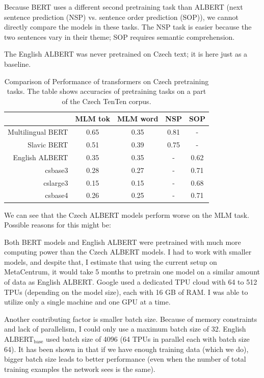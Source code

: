 \documentclass[
  printed, %
  color,   %
  table,   %
  oneside, %
  lof,     %
  lot,     %
]{fithesis3}
\begin{document}
Because BERT uses a different second pretraining task than ALBERT (next sentence prediction (NSP) vs. sentence order prediction (SOP)), we cannot directly compare the models in these tasks. The NSP task is easier because the two sentences vary in their theme; SOP requires semantic comprehension. 

The English ALBERT was never pretrained on Czech text; it is here just as a baseline.

\begin{table}[h]
\centering
\begin{tabular}{r|c|c|c|c}
                           & MLM tok & MLM word & NSP  & SOP  \\ 
    \toprule
    Multilingual BERT      & 0.65     & 0.35      & 0.81 & -    \\
    Slavic BERT            & 0.51     & 0.39      & 0.75 & -    \\ 
    English ALBERT         & 0.35     & 0.35      & -    & 0.62 \\ 
    csbase3                & 0.28     & 0.27      & -    & 0.71 \\ 
    cslarge3               & 0.15     & 0.15      & -    & 0.68 \\ 
    csbase4                & 0.26     & 0.25      & -    & 0.71 \\ 
\end{tabular}
\caption[Performance of transformers on Czech pretraining tasks]{Comparison of Performance of transformers on Czech pretraining tasks. The table shows accuracies of pretraining tasks on a part of the Czech TenTen corpus.}
\label{tab:pretr-compare}
\end{table} %

We can see that the Czech ALBERT models perform worse on the MLM task. Possible reasons for this might be:

Both BERT models and English ALBERT were pretrained with much more computing power than the Czech ALBERT models. I had to work with smaller models, and despite that, I estimate that using the current setup on MetaCentrum, it would take 5 months to pretrain one model on a similar amount of data as English ALBERT. Google used a dedicated TPU cloud with 64 to 512 TPUs (depending on the model size), each with 16 GB of RAM. I was able to utilize only a single machine and one GPU at a time.

Another contributing factor is smaller batch size. Because of memory constraints and lack of parallelism, I could only use a maximum batch size of 32. English ALBERT$_{\text{base}}$ used batch size of 4096 (64 TPUs in parallel each with batch size 64). It has been shown in \parencite[page 27, Figure 11]{batch-size} that if we have enough training data (which we do), bigger batch size leads to better performance (even when the number of total training examples the network sees is the same).
\end{document}
